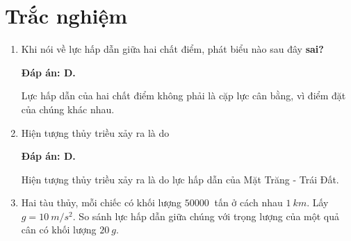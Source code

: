 \whiteBGstarBegin
\setcounter{section}{0}
\section{Trắc nghiệm}
\begin{enumerate}[label=\bfseries Câu \arabic*:]
	
	\item {}
	
	\cauhoi
	{Khi nói về lực hấp dẫn giữa hai chất điểm, phát biểu nào sau đây \textbf{sai?}
	}
	
	\loigiai
	{	\textbf{Đáp án: D.}
		
Lực hấp dẫn của hai chất điểm không phải là cặp lực cân bằng, vì điểm đặt của chúng khác nhau.
	}
	\item {}
	
	\cauhoi
	{Hiện tượng thủy triều xảy ra là do
	}
	\loigiai
	{	\textbf{Đáp án: D.}
		
Hiện tượng thủy triều xảy ra là do lực hấp dẫn của Mặt Trăng - Trái Đất.
	}

	\item {}
	
	\cauhoi
	{Hai tàu thủy, mỗi chiếc có khối lượng $\SI{50000}{}$ tấn ở cách nhau $\SI{1}{km}$. Lấy $g=\SI{10}{m/s^2}$. So sánh lực hấp dẫn giữa chúng với trọng lượng của một quả cân có khối lượng $\SI{20}{g}$.
	}
	

\end{enumerate}
